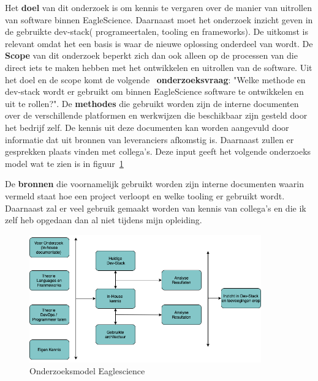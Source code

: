 {Het \textbf{doel} van dit onderzoek is om kennis te vergaren over de manier van uitrollen van software binnen EagleScience. Daarnaast moet het onderzoek inzicht geven in de gebruikte dev-stack( programeertalen, tooling en frameworks). De uitkomst is relevant omdat het een basis is waar de nieuwe oplossing onderdeel van wordt. De \textbf{Scope} van dit onderzoek beperkt zich dan ook alleen op de processen van die direct iets te maken hebben met het ontwikkelen en uitrollen van de software. Uit het doel en de scope komt de volgende ~\textbf{onderzoeksvraag}: "Welke methode en dev-stack wordt er gebruikt om binnen EagleScience software te ontwikkelen en uit te rollen?". De \textbf{methodes} die gebruikt worden zijn de interne documenten over de verschillende platformen en werkwijzen die beschikbaar zijn gesteld door het bedrijf zelf. De kennis uit deze documenten kan worden aangevuld door informatie dat uit bronnen van leveranciers afkomstig is. Daarnaast zullen er gesprekken plaats vinden met collega's. Deze input geeft het volgende onderzoeks model wat te zien is in figuur~\ref{fig:OnderzoeksModelEaglescience}


De \textbf{bronnen} die voornamelijk gebruikt worden zijn interne documenten waarin vermeld staat hoe een project verloopt en welke tooling er gebruikt wordt. Daarnaast zal er veel gebruik gemaakt worden van kennis van collega's en die ik zelf heb opgedaan dan al niet tijdens mijn opleiding.
\begin{figure}[htbp]
    \myfloatalign
    \includegraphics[width=10cm]{gfx/OnderzoeksmodelES}
    \caption{Onderzoeksmodel Eaglescience}
    \label{fig:OnderzoeksModelEaglescience}
\end{figure}





}
